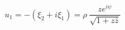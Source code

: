 \begin{equation}
u_{1} = -(\xi_{2} + i \xi_{1}) = \rho~\frac{z e^{i\psi}}{\sqrt{1+z\bar{z}}}  \label{6.12a}
\end{equation}

